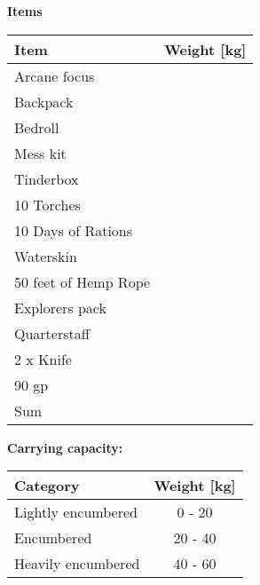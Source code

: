 \documentclass[11pt]{article}
\begin{document}
	\begin{center}
{\LARGE \textbf{Items}}
	\end{center}

	\begin{tabularx}{\textwidth}{X|r}
Item & Weight [kg] \\
\hline
Arcane focus								&			\\
Backpack									&			\\
Bedroll										&			\\
Mess kit									&			\\
Tinderbox									&			\\
10 Torches									&			\\
10 Days of Rations							&			\\
Waterskin									&			\\
50 feet of Hemp Rope						&			\\
Explorers pack								&			\\
Quarterstaff								&			\\
2 x Knife									&			\\
90 gp 										& 			\\
\hline
Sum 										& 			\\
	\end{tabularx}

\vspace{10mm}

\textbf{Carrying capacity:} \\

	\begin{tabular}{l|c}
Category & Weight [kg] \\
\hline
Lightly encumbered 	& 0 - 20 	\\
Encumbered 			& 20 - 40	\\
Heavily encumbered	& 40 - 60	\\
	\end{tabular}
\end{document}
